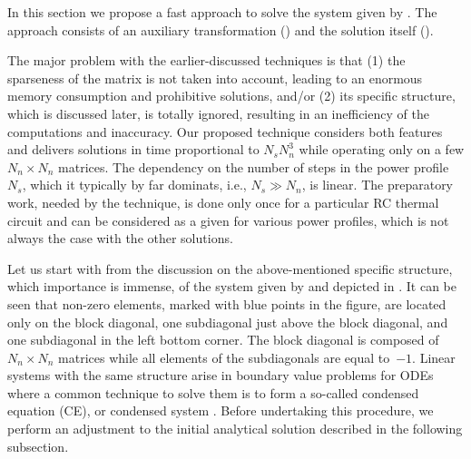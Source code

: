 In this section we propose a fast approach to solve the system given by . The approach consists of an auxiliary transformation () and the solution itself ().

The major problem with the earlier-discussed techniques is that (1) the sparseness of the matrix is not taken into account, leading to an enormous memory consumption and prohibitive solutions, and/or (2) its specific structure, which is discussed later, is totally ignored, resulting in an inefficiency of the computations and inaccuracy. Our proposed technique considers both features and delivers solutions in time proportional to $N_s N_n^3$ while operating only on a few $N_n \times N_n$ matrices. The dependency on the number of steps in the power profile $N_s$, which it typically by far dominats, i.e., $N_s \gg N_n$, is linear. The preparatory work, needed by the technique, is done only once for a particular RC thermal circuit and can be considered as a given for various power profiles, which is not always the case with the other solutions.


Let us start with from the discussion on the above-mentioned specific structure, which importance is immense, of the system given by  and depicted in . It can be seen that non-zero elements, marked with blue points in the figure, are located only on the block diagonal, one subdiagonal just above the block diagonal, and one subdiagonal in the left bottom corner. The block diagonal is composed of $N_n \times N_n$ matrices while all elements of the subdiagonals are equal \mbox{to $-1$}. Linear systems with the same structure arise in boundary value problems for ODEs where a common technique to solve them is to form a so-called condensed equation (CE), or condensed system \cite{stoer2002}. Before undertaking this procedure, we perform an adjustment to the initial analytical solution described in the following subsection.

